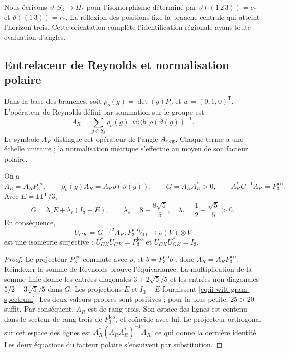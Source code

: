 Nous écrivons \(\vartheta:S_3\to H_*\) pour l’isomorphisme déterminé
par \(\vartheta((1\,2\,3))=c_*\) et
\(\vartheta((1\,3))=r_*\). La réflexion des positions fixe la branche
centrale qui atteint l’horizon trois. Cette orientation complète
l’identification régionale avant toute évaluation d’angles.

\subsection{Entrelaceur de Reynolds et normalisation polaire}

Dans la base des branches, soit \(\rho_o(g)=\det(g)P_g\) et
\(w=(0,1,0)^{\mathsf T}\). L’opérateur de Reynolds défini par sommation
sur le groupe est
\begin{equation}
 A_R=\sum_{g\in S_3}\rho_o(g)\,|w\rangle\langle b|\,
                       \rho(\vartheta(g))^{-1}.
 \label{eq:ii-witt-reynolds}
\end{equation}
Le symbole \(A_R\) distingue cet opérateur de l’angle
\(A_{\rm deg}\). Chaque terme a une échelle unitaire ; la normalisation
métrique s’effectue au moyen de son facteur polaire.

\begin{proposition}
\label{prop:ii-witt-polar}
On a
\[
 A_R=A_RP_3^{\mathrm{ico}},\qquad
 \rho_o(g)A_R=A_R\rho(\vartheta(g)),\qquad
 G=A_RA_R^*>0,\qquad A_R^*G^{-1}A_R=P_3^{\mathrm{ico}}.
\]
Avec \(E=\mathbf1\mathbf1^{\mathsf T}/3\),
\begin{equation}
 G=\lambda_sE+\lambda_t(I_3-E),\qquad
 \lambda_s=8+\frac{8\sqrt5}{5},\quad
 \lambda_t=\frac12-\frac{\sqrt5}{5}>0.
 \label{eq:ii-witt-gram-spectrum}
\end{equation}
En conséquence,
\[
 U_{GK}=G^{-1/2}A_R:P_3^{\mathrm{ico}}V_{11}\longrightarrow o(V)\otimes V
\]
est une isométrie surjective :
\(U_{GK}^*U_{GK}=P_3^{\mathrm{ico}}\) et \(U_{GK}U_{GK}^*=I_3\).
\end{proposition}
\begin{proof}
Le projecteur \(P_3^{\mathrm{ico}}\) commute avec \(\rho\), et \(b=P_3^{\mathrm{ico}}b\) ;
donc \(A_R=A_RP_3^{\mathrm{ico}}\). Réindexer la somme de Reynolds prouve
l’équivariance. La multiplication de la somme finie donne les entrées diagonales
\(3+2\sqrt5/5\) et les entrées non diagonales
\(5/2+3\sqrt5/5\) dans \(G\). Les projections \(E\) et \(I_3-E\)
fournissent \eqref{eq:ii-witt-gram-spectrum}. Les deux valeurs propres sont
positives ; pour la plus petite, \(25>20\) suffit. Par conséquent, \(A_R\) est de
rang trois. Son espace des lignes est contenu dans le secteur de rang trois
de \(P_3^{\mathrm{ico}}\), et coïncide avec lui. Le projecteur orthogonal sur cet espace
des lignes est \(A_R^*(A_RA_R^*)^{-1}A_R\), ce qui donne la dernière identité.
Les deux équations du facteur polaire s’ensuivent par substitution.
\end{proof}

